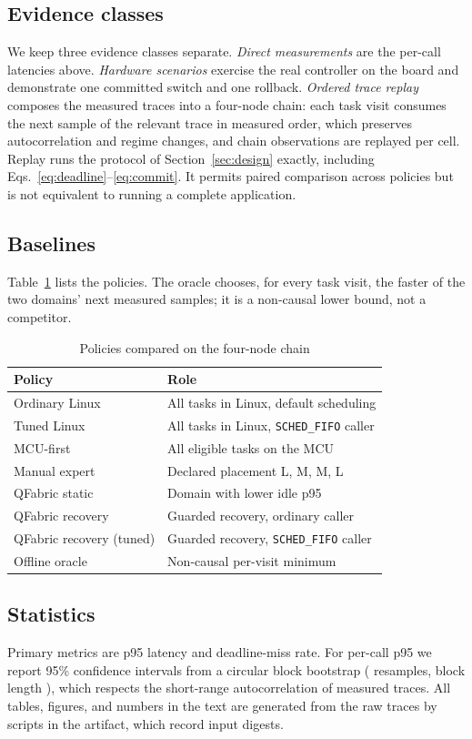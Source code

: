 \documentclass[conference]{IEEEtran}
\newcommand{\system}{QFabric\xspace}
\begin{document}
\subsection{Evidence classes}
We keep three evidence classes separate. \emph{Direct measurements} are the
per-call latencies above. \emph{Hardware scenarios} exercise the real
controller on the board and demonstrate one committed switch and one
rollback. \emph{Ordered trace replay} composes the measured traces into a
four-node chain: each task visit consumes the next sample of the relevant
trace in measured order, which preserves autocorrelation and regime changes,
and \StageTwelveChainObservations{} chain observations are replayed per cell.
Replay runs the protocol of Section~\ref{sec:design} exactly, including
Eqs.~\eqref{eq:deadline}--\eqref{eq:commit}. It permits paired comparison
across policies but is not equivalent to running a complete application.

\subsection{Baselines}
Table~\ref{tab:baselines} lists the policies. The oracle chooses, for every
task visit, the faster of the two domains' next measured samples; it is a
non-causal lower bound, not a competitor.

\begin{table}[t]
\caption{Policies compared on the four-node chain}
\label{tab:baselines}
\centering
\small
\begin{tabular}{lp{4.3cm}}
\toprule
Policy & Role \\
\midrule
Ordinary Linux & All tasks in Linux, default scheduling \\
Tuned Linux & All tasks in Linux, \texttt{SCHED\_FIFO} caller \\
MCU-first & All eligible tasks on the MCU \\
Manual expert & Declared placement L, M, M, L \\
\system static & Domain with lower idle p95 \\
\system recovery & Guarded recovery, ordinary caller \\
\system recovery (tuned) & Guarded recovery, \texttt{SCHED\_FIFO} caller \\
Offline oracle & Non-causal per-visit minimum \\
\bottomrule
\end{tabular}
\end{table}

\subsection{Statistics}
Primary metrics are p95 latency and deadline-miss rate. For per-call p95 we
report 95\% confidence intervals from a circular block bootstrap
(\StageTwelveBootstrapResamples{} resamples, block length
\StageTwelveBootstrapBlock), which respects the short-range autocorrelation of
measured traces. All tables, figures, and numbers in the text are generated
from the raw traces by scripts in the artifact, which record input digests.
\end{document}
